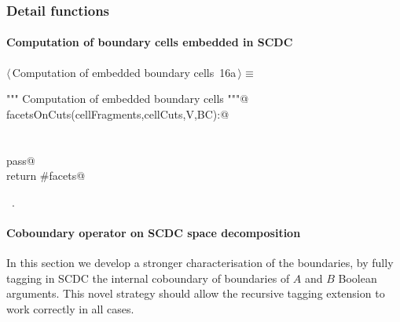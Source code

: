 \documentclass[11pt,oneside]{article}	%
\begin{document}
\subsubsection{Detail functions}



\paragraph{Computation of boundary cells embedded in SCDC}

\begin{flushleft} \small \label{scrap17}
\protect{}$\langle\,$Computation of embedded boundary cells\nobreak\ {\footnotesize 16a}$\,\rangle\equiv$
\vspace{-1ex}
\begin{list}{}{} \item
\mbox{}\verb@""" Computation of embedded boundary cells """@\\
\mbox{}\verb@def facetsOnCuts(cellFragments,cellCuts,V,BC):@\\
\mbox{}\verb@@\\
\mbox{}\verb@@\\
\mbox{}\verb@   pass@\\
\mbox{}\verb@   return #facets@\\
\mbox{}\verb@@{\NWsep}
\end{list}
\vspace{-1ex}
\footnotesize\addtolength{\baselineskip}{-1ex}
\begin{list}{}{\setlength{\itemsep}{-\parsep}\setlength{\itemindent}{-\leftmargin}}
\item \NWtxtMacroRefIn\ .
\end{list}
\end{flushleft}


\paragraph{Coboundary operator on SCDC space decomposition}

In this section we develop a stronger characterisation of the boundaries, by fully tagging in SCDC the internal coboundary of boundaries of $A$ and $B$ Boolean arguments. This novel strategy should allow the recursive tagging extension to work correctly in all cases.
\end{document}
